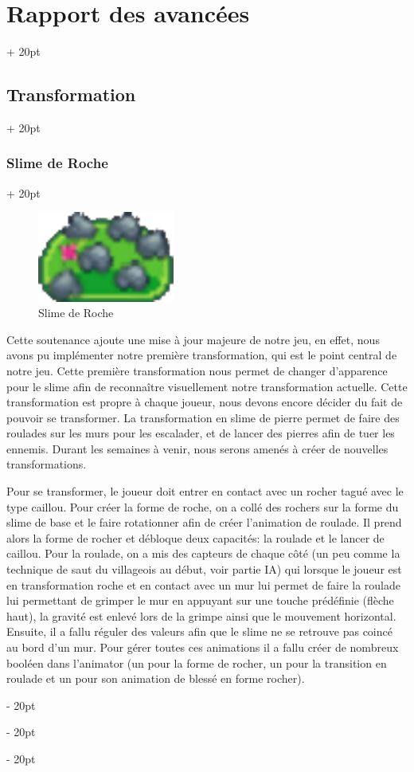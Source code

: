 \documentclass[a4paper, 12pt, twoside]{article}
\newcommand{\ind}[1][20pt]{\advance\leftskip + #1}
\newcommand{\deind}[1][20pt]{\advance\leftskip - #1}
\newenvironment{indt}[2][20pt]{#2 \par \ind[#1]}{\par \deind} %
\begin{document}
\begin{indt}{\section{Rapport des avancées}}
        \begin{indt}{\subsection{Transformation}}
            \begin{indt}{\subsubsection{Slime de Roche}}
                \begin{figure}[h]
                    \centering
                    \includegraphics[width=0.4\textwidth]{slime_rock.png}
                    \caption{Slime de Roche}
                    \label{fig:mesh1}
                \end{figure}

                Cette soutenance ajoute une mise à jour majeure de notre jeu, en effet, nous avons pu implémenter notre première transformation, qui est le point central de notre jeu. Cette première transformation nous permet de changer d’apparence pour le slime afin de reconnaître visuellement notre transformation actuelle. Cette transformation est propre à chaque joueur, nous devons encore décider du fait de pouvoir se transformer. La transformation en slime de pierre permet de faire des roulades sur les murs pour les escalader, et de lancer des pierres afin de tuer les ennemis. Durant les semaines à venir, nous serons amenés à créer de nouvelles transformations.

                Pour se transformer, le joueur doit entrer en contact avec un rocher tagué avec le type caillou. Pour créer la forme de roche, on a collé des rochers sur la forme du slime de base et le faire rotationner afin de créer l’animation de roulade. Il prend alors la forme de rocher et débloque deux capacités: la roulade et le lancer de caillou. Pour la roulade, on a mis des capteurs de chaque côté (un peu comme la technique de saut du villageois au début, voir partie IA) qui lorsque le joueur est en transformation roche et en contact avec un mur lui permet de faire la roulade lui permettant de grimper le mur en appuyant sur une touche prédéfinie (flèche haut), la gravité est enlevé lors de la grimpe ainsi que le mouvement horizontal. Ensuite, il a fallu réguler des valeurs afin que le slime ne se retrouve pas coincé au bord d’un mur. Pour gérer toutes ces animations il a fallu créer de nombreux booléen dans l’animator (un pour la forme de rocher, un pour la transition en roulade et un pour son animation de blessé en forme rocher).


\end{indt}
\end{indt}
\end{indt}
\end{document}

